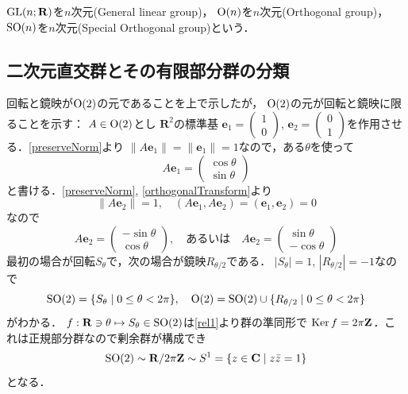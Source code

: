 $\operatorname{GL}(n;\mathbf R)$を$n$次元(General linear group)，
$\operatorname{O}(n)$を$n$次元(Orthogonal group)，$\operatorname{SO}(n)$を$n$次元(Special Orthogonal group)という．

%


\subsection{二次元直交群とその有限部分群の分類}
回転と鏡映が$\operatorname{O}(2)$の元であることを上で示したが，
$\operatorname{O}(2)$の元が回転と鏡映に限ることを示す：
$A\in \operatorname{O}(2)$とし
$\mathbf R^2$の標準基
$
     \mathbf e_1
     =
     \begin{pmatrix}
              1\\0
     \end{pmatrix}$, 
$     \mathbf e_2
     =
     \begin{pmatrix}
              0\\1
     \end{pmatrix}
$を作用させる．\eqref{preserveNorm}より
$\|A\mathbf e_1\|=\|\mathbf e_1\|=1$なので，ある$\theta$を使って
\[
     A\mathbf e_1
     =\begin{pmatrix}
              \cos\theta\\\sin\theta
     \end{pmatrix}
\]
と書ける．\eqref{preserveNorm}, \eqref{orthogonalTransform}より
\[
     \|A\mathbf e_2\|=1,\quad 
     (A\mathbf e_1,A\mathbf e_2)=(\mathbf e_1,\mathbf e_2)=0
\]
なので
\[
     A\mathbf e_2
     =
     \begin{pmatrix}
         -\sin\theta\\\cos\theta
     \end{pmatrix},
     \quad\text{あるいは}\quad
     A\mathbf e_2
     =
     \begin{pmatrix}
         \sin\theta\\-\cos\theta
     \end{pmatrix}
\]
最初の場合が回転$S_\theta$で，次の場合が鏡映$R_{\theta/2}$である．
$|S_\theta|=1$, $|R_{\theta/2}|=-1$なので
\[
     \operatorname{SO}(2)=\{S_\theta\mid 0\le \theta<2\pi\},\quad
     \operatorname{O}(2)=\operatorname{SO}(2)\cup \{R_{\theta/2}\mid 0\le \theta<2\pi\}
\]
がわかる．
$f:\mathbf R\ni\theta\mapsto S_\theta\in \operatorname{SO}(2)$は\eqref{rel1}より群の準同形で
$\operatorname{Ker} f= 2\pi \mathbf Z$．これは正規部分群なので剰余群が構成でき
\[
     \operatorname{SO}(2)\sim \mathbf R/2\pi \mathbf Z
     \sim S^1=\{z\in \mathbf C\mid z\bar z=1\}
\]
となる．

